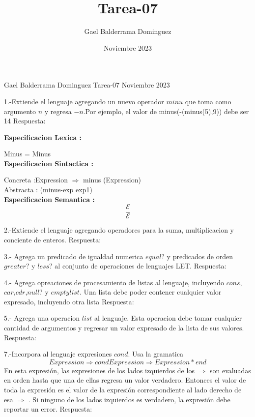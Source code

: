 \documentclass{article}
\author{Gael Balderrama Dominguez}
\title{Tarea-07}
\date{Noviembre 2023}
\begin{document}
\begin{center}
    Gael Balderrama Dominguez \linebreak
    Tarea-07 \linebreak
    Noviembre 2023 \linebreak
\end{center}

1.-Extiende el lenguaje agregando un nuevo operador $minu$ que toma como argumento $n$ y regresa $-n$.Por ejemplo, el valor de minus(-(minus(5),9)) debe ser 14 \newline
Respuesta: \newline

\textbf{Especificacion Lexica :} \newline

Minus = Minus \\

\textbf{Especificacion Sintactica :} \newline

Concreta :Expression $\Rightarrow $ minus (Expression) \\

Abstracta : (minus-exp exp1)\\


\textbf{Especificacion Semantica :} \newline
$$
\frac{\mathcal{E} }{\mathcal{E} 
}
$$


2.-Extiende el lenguaje agregando operadores para la suma, multiplicacion y conciente de enteros. \newline
Respuesta: \newline

3.- Agrega un predicado de igualdad numerica $equal?$ y predicados de orden $greater?$ y $less?$ al conjunto de operaciones de lenguajes LET.
Respuesta: \newline

4.- Agrega opreaciones de procesamiento de listas al lenguaje, incluyendo $cons$,$car$,$cdr$,$null?$ y $emptylist$. Una lista debe poder contener cualquier valor expresado, incluyendo otra lista
Respuesta: \newline

5.- Agrega una operacion $list$ al lenguaje. Esta operacion debe tomar cualquier cantidad de argumentos y regresar un valor expresado de la lista de sus valores.\newline
Respuesta: \newline

7.-Incorpora al lenguaje expresiones $cond$. Usa la gramatica 
$$ Expression \Rightarrow cond {Expression \Rightarrow Expression}* end$$
En esta expresión, las expresiones de los lados izquierdos de los $\Rightarrow$  son evaluadas en orden
hasta que una de ellas regresa un valor verdadero. Entonces el valor de toda la expresión es
el valor de la expresión correspondiente al lado derecho de esa $\Rightarrow$ . Si ninguno de los lados
izquierdos es verdadero, la expresión debe reportar un error. \newline
Respuesta: \newline
\end{document}
